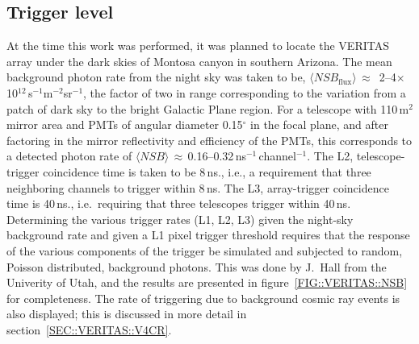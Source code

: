 \subsection{Trigger level}
\label{SEC::VERITAS::V4TRIGGER}

At the time this work was performed, it was planned to locate the
VERITAS array under the dark skies of Montosa canyon in southern
Arizona. The mean background photon rate from the night sky was taken
to be, $\langle NSB_{\mathrm{flux}}\rangle$\,$\approx$
\,2--4$\times$10$^{12}$\,s$^{-1}$m$^{-2}$sr$^{-1}$,
the factor of two in range corresponding to the variation from a patch
of dark sky to the bright Galactic Plane region. For a telescope with
110\,m$^2$ mirror area and PMTs of angular diameter 0.15$^\circ$ in
the focal plane, and after factoring in the mirror reflectivity and
efficiency of the PMTs, this corresponds to a detected photon rate of
$\langle NSB 
\rangle$\,$\approx$\,0.16--0.32\,ns$^{-1}$\,channel$^{-1}$. The L2,
telescope-trigger coincidence time is taken to be 8\,ns., i.e., a
requirement that three neighboring channels to trigger within
8\,ns. The L3, array-trigger coincidence time is 40\,ns., i.e.\
requiring that three telescopes trigger within 40\,ns. Determining the
various trigger rates (L1, L2, L3) given the night-sky background rate
and given a L1 pixel trigger threshold requires that the response of
the various components of the trigger be simulated and subjected to
random, Poisson distributed, background photons. This was done by
J.~Hall from the Univerity of Utah, and the results are presented in
figure~\ref{FIG::VERITAS::NSB} for completeness. The rate of
triggering due to background cosmic ray events is also displayed; this
is discussed in more detail in section~\ref{SEC::VERITAS::V4CR}.

